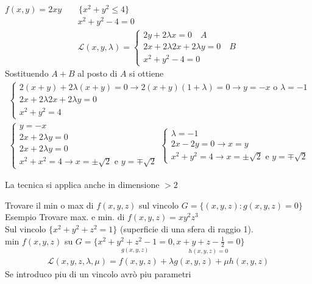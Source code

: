 \documentclass[a4paper, oneside]{article}
\begin{document}
        \begin{example}
            $f(x,y) = 2xy \qquad \{x^2+y^2 \leq 4\}$\\
            \begin{gather*}
                x^2+y^2 -4 = 0\\
                \mathcal{L}(x,y,\lambda) = 
                \begin{cases}
                    2y + 2\lambda x = 0 \quad A\\
                    2x+ 2\lambda 2x + 2\lambda y = 0 \quad B\\
                    x^2+y^2 -4 = 0
                \end{cases}
            \end{gather*}
            Sostituendo $A+B$ al posto di $A$ si ottiene\begin{gather*}
                \begin{cases}
                    2(x+y) +2\lambda(x+y) = 0 \to 2(x+y)(1+\lambda) = 0 \to y = -x \text{ o } \lambda = -1\\
                    2x+ 2\lambda 2x + 2\lambda y = 0 \\
                    x^2+y^2 = 4
                \end{cases}\\
                \begin{cases}
                    y = -x\\
                    2x+2\lambda y = 0\\
                    2x + 2\lambda y = 0\\
                    x^2+x^2 = 4 \to x = \pm \sqrt{2} \text{ e } y = \mp \sqrt{2}
                \end{cases}
                \begin{cases}
                    \lambda = -1\\
                    2x-2y = 0 \to x = y\\
                    x^2+y^2 = 4 \to x = \pm \sqrt{2} \text{ e } y = \mp \sqrt{2}
                \end{cases}
            \end{gather*}
        \end{example}
        \noindent
        La tecnica si applica anche in dimensione $> 2$
        \begin{example}
            Trovare il min o max di $f(x,y,z)$ sul vincolo $G= \{(x,y,z) : g(x,y,z) = 0\}$\\
            Esempio Trovare max. e min. di $f(x,y,z) = xy^2z^3$\\
            Sul vincolo $\{x^2+y^2+z^2=1\}$ (superficie di una sfera di raggio 1).\\
            min $f(x,y,z)$ su $G=\{\underset{g(x,y,z)}{x^2+y^2+z^2 -1 = 0} , \underset{h(x,y,z) = 0}{x+y+z -\frac{1}{2} = 0}\}$\\
            \begin{gather*}
                \mathcal{L}(x,y,z,\lambda,\mu) = f(x,y,z) + \lambda g(x,y,z) + \mu h(x,y,z)
            \end{gather*}
            Se introduco piu di un vincolo avrò piu parametri 
        \end{example}
\newpage
\end{document}
